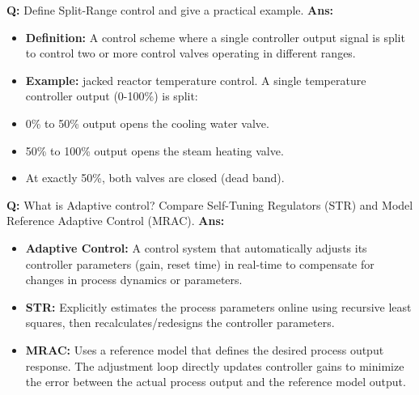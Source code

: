 \documentclass[10pt,a4paper,twocolumn]{article}
\begin{document}
\begin{tcolorbox}[
  colback=white,
  colframe=UnitColorFour,
  colbacktitle=gray!10!white,
  coltitle=black,
  fonttitle=\bfseries\sffamily\small,
  title={Unit IV $\bullet$ Card 7: Split-Range Control},
  boxrule=1.2pt,
  arc=2mm,
  outer arc=2mm,
  boxsep=1.5mm,
  top=1mm,
  bottom=1mm,
  left=1.5mm,
  right=1.5mm,
  before skip=2.5mm,
  after skip=2.5mm
]
\textbf{Q:} Define Split-Range control and give a practical example.
\tcbline
\textbf{Ans:} \begin{itemize}
  \item   \textbf{Definition:} A control scheme where a single controller output signal is split to control two or more control valves operating in different ranges.
  \item   \textbf{Example:} jacked reactor temperature control. A single temperature controller output (0-100\%) is split:
  \item   0\% to 50\% output opens the cooling water valve.
  \item   50\% to 100\% output opens the steam heating valve.
  \item   At exactly 50\%, both valves are closed (dead band).
\end{itemize}
\end{tcolorbox}


\begin{tcolorbox}[
  colback=white,
  colframe=UnitColorFour,
  colbacktitle=gray!10!white,
  coltitle=black,
  fonttitle=\bfseries\sffamily\small,
  title={Unit IV $\bullet$ Card 8: Adaptive Control (STR vs. MRAC)},
  boxrule=1.2pt,
  arc=2mm,
  outer arc=2mm,
  boxsep=1.5mm,
  top=1mm,
  bottom=1mm,
  left=1.5mm,
  right=1.5mm,
  before skip=2.5mm,
  after skip=2.5mm
]
\textbf{Q:} What is Adaptive control? Compare Self-Tuning Regulators (STR) and Model Reference Adaptive Control (MRAC).
\tcbline
\textbf{Ans:} \begin{itemize}
  \item   \textbf{Adaptive Control:} A control system that automatically adjusts its controller parameters (gain, reset time) in real-time to compensate for changes in process dynamics or parameters.
  \item   \textbf{STR:} Explicitly estimates the process parameters online using recursive least squares, then recalculates/redesigns the controller parameters.
  \item   \textbf{MRAC:} Uses a reference model that defines the desired process output response. The adjustment loop directly updates controller gains to minimize the error between the actual process output and the reference model output.
\end{itemize}
\end{tcolorbox}
\end{document}

